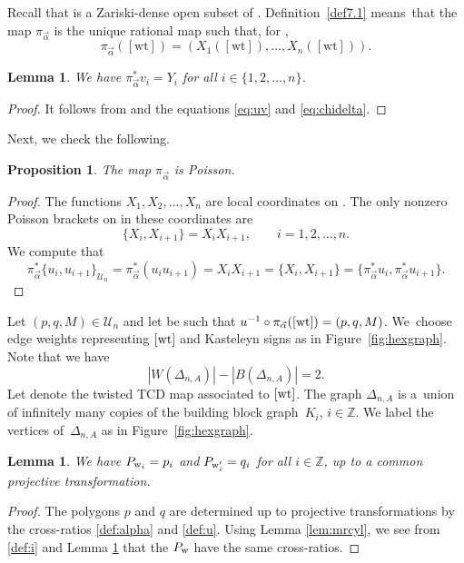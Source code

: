 \documentclass[10pt,a4paper]{amsart}
\numberwithin{equation}{section}
\newtheorem{Lemma}[Theorem]{Lemma}
\newtheorem{Proposition}[Theorem]{Proposition}
 { \theoremstyle{definition}
\newtheorem{Definition}[Theorem]{Definition}
\newtheorem{Note}[Theorem]{Note}
\newtheorem{Example}[Theorem]{Example}
\newtheorem{Remark}[Theorem]{Remark} }
\newcommand{\Z}{{\mathbb Z}}
\newcommand{\CP}{{\mathbb C\mathrm P}}
\newcommand{\A}{{\mathbb A}}
\newcommand{\ra}{\rightarrow}
\newcommand{\la}{\label}
\newcommand{\w}{{\rm w}}
\newcommand{\wt}{{\rm wt}}
\def\A{A}
\def\widehat#1{#1}
\begin{document}
Recall that  is a Zariski-dense open subset of . Definition~\ref{def7.1} means~that the map $\pi_{\vec \alpha}$ is the unique rational map such that, for ,
	\[
	\pi_{\vec \alpha}([\mathrm{wt}])=(X_1([\mathrm{wt}]),\dots,X_n([\mathrm{wt}])).
	\]
	
	\begin{Lemma}\la{lem:vzzdelta}
		We have $\pi_{\vec \alpha}^*v_i = Y_i$ 	for all $i \in \{1,2,\dots,n\}$.
	\end{Lemma}
	\begin{proof}
		It follows from  and the equations \eqref{eq:uv} and \eqref{eq:chidelta}.
	\end{proof}

	Next, we check the following.

	\begin{Proposition}\label{p:Poisson}
		The map $\pi_{\vec \alpha}$ is Poisson.
	\end{Proposition}
	\begin{proof}
		The functions $X_1,X_2,\dots,X_{n}$ are local coordinates on . The only nonzero Poisson brackets on  in these coordinates are
		\[
		\{X_i,X_{i+1}\}=X_i X_{i+1},\qquad i=1,2,\dots,n.
		\]
		We compute that
		\[
		{\pi_{\vec \alpha}^*\{u_i,u_{i+1}\}_{\mathcal U_n}=\pi_{\vec \alpha}^*(u_iu_{i+1})=X_i X_{i+1}=\{X_i,X_{i+1}\}=\bigl\{\pi_{\vec \alpha}^*u_i,\pi_{\vec \alpha}^*u_{i+1}\bigr\}.}
\tag*{\qed}
  \]
\renewcommand{\qed}{}
\end{proof}

	Let $(p,q,M)\in\mathcal U_n$ and let \smash{$[\wt] \in \mathcal X_{N_{\Delta_n},\vec \alpha}^\lambda$} be such that $u^{-1} \circ \pi_{\vec \alpha}([\wt])=(p,q,M)$. We~choose edge weights representing $[\wt]$ and Kasteleyn signs as in Figure~\ref{fig:hexgraph}.
	Note that we have
\[
|W(\Delta_{n,\A})|-|B(\Delta_{n,\A})|=2.
\]
 Let \smash{$P\colon W(\Delta_{n,\widehat \A}) \ra \CP^1$} denote the twisted TCD map associated to $[\wt]$. The graph $\Delta_{n,\widehat \A}$ is a~union of infinitely many copies of the building block graph~$K_i$, $i \in \Z$. We label the vertices of~$\Delta_{n,\widehat \A}$ as in Figure~\ref{fig:hexgraph}.
	
	\begin{Lemma}%
		We have $P_{\w_i}=p_i$ and $P_{\w'_i}=q_i$ for all $i \in \Z$, up to a {common} projective transformation.
	\end{Lemma}
	\begin{proof}
		The polygons $p$ and $q$ are determined up to projective transformations by the cross-ratios \eqref{def:alpha} and \eqref{def:u}. Using Lemma \ref{lem:mrcyl}, we see from \eqref{def:i} and Lemma \ref{lem:vzzdelta} that the $P_\w$ have the same cross-ratios.
	\end{proof}
\end{document}
